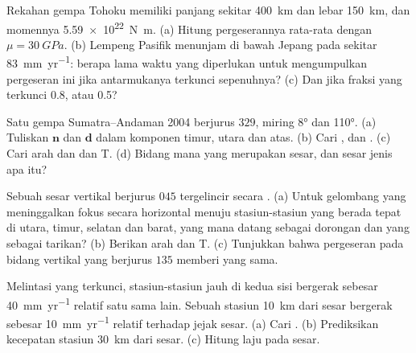 \begin{exercise}[$\star\star$]\label{exo:b1:earthquake-source:6}
Rekahan gempa Tohoku memiliki panjang sekitar \qty{400}{km} dan lebar \qty{150}{km}, dan momennya \qty{5.59e22}{N.m}. (a) Hitung pergeserannya rata-rata dengan $\mu = \qty{30}{GPa}$. (b) Lempeng Pasifik menunjam di bawah Jepang pada sekitar \qty{83}{mm.yr^{-1}}: berapa lama waktu yang diperlukan untuk mengumpulkan pergeseran ini jika antarmukanya terkunci sepenuhnya? (c) Dan jika fraksi yang terkunci 0.8, atau 0.5?
\end{exercise}

\begin{exercise}[$\star\star$]\label{exo:b1:earthquake-source:7}
Satu  gempa Sumatra--Andaman 2004 berjurus $329$, miring \ang{8} dan  \ang{110}. (a) Tuliskan $\mathbf n$ dan $\mathbf d$ dalam komponen timur, utara dan atas. (b) Cari ,  dan  . (c) Cari arah dan   dan T. (d) Bidang mana yang merupakan sesar, dan sesar jenis apa itu?
\end{exercise}

\begin{exercise}[$\star\star$]\label{exo:b1:earthquake-source:8}
Sebuah sesar vertikal berjurus $045$ tergelincir secara . (a) Untuk gelombang yang meninggalkan fokus secara horizontal menuju stasiun-stasiun yang berada tepat di utara, timur, selatan dan barat, yang mana datang sebagai dorongan dan yang sebagai tarikan? (b) Berikan arah  dan T. (c) Tunjukkan bahwa pergeseran  pada bidang vertikal yang berjurus $135$ memberi  yang sama.
\end{exercise}

\begin{exercise}[$\star\star$]\label{exo:b1:earthquake-source:9}
Melintasi  yang terkunci, stasiun-stasiun jauh di kedua sisi bergerak sebesar \qty{40}{mm.yr^{-1}} relatif satu sama lain. Sebuah stasiun \qty{10}{km} dari sesar bergerak sebesar \qty{10}{mm.yr^{-1}} relatif terhadap jejak sesar. (a) Cari . (b) Prediksikan kecepatan stasiun \qty{30}{km} dari sesar. (c) Hitung laju  pada sesar.
\end{exercise}

